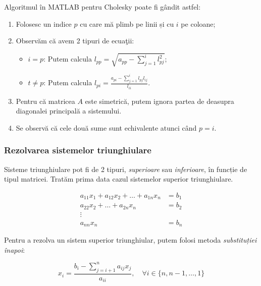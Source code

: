 \documentclass{exam}
\newcommand{\octavescript}[2]{

}
\begin{document}
\par Algoritmul în MATLAB pentru Cholesky poate fi gândit astfel:

\begin{enumerate}
	\item Folosesc un indice $p$ cu care mă plimb pe linii și cu $i$ pe coloane;
	\item Observăm că avem 2 tipuri de ecuaţii:
	      \begin{itemize}
		      \item $i = p$: Putem calcula $l_{pp} = \sqrt{a_{pp} - \sum_{j = 1}^{i}{l_{pj}^2}}$;
		      \item $t \neq p$: Putem calcula $l_{pi} = \frac{a_{pi} - \sum_{j = 1}^{i}{l_{pj} l_{ij}}}{l_{ii}}$.
	      \end{itemize}
	\item Pentru că matricea $A$ este simetrică, putem ignora partea de deasupra
	      diagonalei principală a sistemului.
	\item Se observă că cele două sume sunt echivalente atunci când $p = i$.
\end{enumerate}

\octavescript{./src/cholesky.m}{}

\subsubsection{Rezolvarea sistemelor triunghiulare}

\par Sisteme triunghiulare pot fi de 2 tipuri, \textit{superioare} sau
\textit{inferioare}, în funcție de tipul matricei. Tratăm prima data cazul
sistemelor superior triunghiulare.

\begin{align*}
	a_{11} x_1 + a_{12} x_2 + \ldots + a_{1n} x_n & = b_1 \\
	a_{22} x_2 + \ldots + a_{2n} x_n              & = b_2 \\
	\vdots                                                \\
	a_{nn} x_n                                    & = b_n
\end{align*}

\par Pentru a rezolva un sistem superior triunghiular, putem folosi metoda
\textit{substituției înapoi}:

\begin{equation}
	x_i = \frac{b_i - \sum_{j = i + 1}^{n}{a_{ij} x_j}}{a_{ii}}, \quad \forall i \in \{n, n - 1, \ldots, 1\}
\end{equation}
\end{document}
